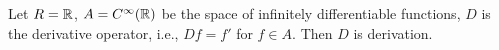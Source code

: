 \begin{example}
  Let
    $R = \mathbb{R}$,
    $A = C^\infty(\mathbb{R})$ be the space of infinitely differentiable functions,
    $D$ is the derivative operator, i.e., $D f = f'$ for $f \in A$.
  Then $D$ is derivation.
\end{example}
